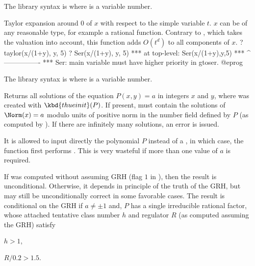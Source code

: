 The library syntax is  where  is a variable number.

\label{se:taylor}
Taylor expansion around $0$ of $x$ with respect to
the simple variable $t$. $x$ can be of any reasonable type, for example a
rational function. Contrary to , which takes the valuation into
account, this function adds $O(t^d)$ to all components of $x$.
\bprog
? taylor(x/(1+y), y, 5)
? Ser(x/(1+y), y, 5)
 ***   at top-level: Ser(x/(1+y),y,5)
 ***                 ^----------------
 *** Ser: main variable must have higher priority in gtoser.
@eprog

The library syntax is  where  is a variable number.

\label{se:thue}
Returns all solutions of the equation
$P(x,y)=a$ in integers $x$ and $y$, where  was created with
$\kbd{thueinit}(P)$. If present,  must contain the solutions of
$\Norm(x)=a$ modulo units of positive norm in the number field
defined by $P$ (as computed by ). If there are infinitely
many solutions, an error is issued.

It is allowed to input directly the polynomial $P$ instead of a ,
in which case, the function first performs . This is
very wasteful if more than one value of $a$ is required.

If  was computed without assuming GRH (flag $1$ in ),
then the result is unconditional. Otherwise, it depends in principle of the
truth of the GRH, but may still be unconditionally correct in some
favorable cases. The result is conditional on the GRH if
$a\neq \pm 1$ and, $P$ has a single irreducible rational factor, whose
attached tentative class number $h$ and regulator $R$ (as computed
assuming the GRH) satisfy

\item $h > 1$,

\item $R/0.2 > 1.5$.

